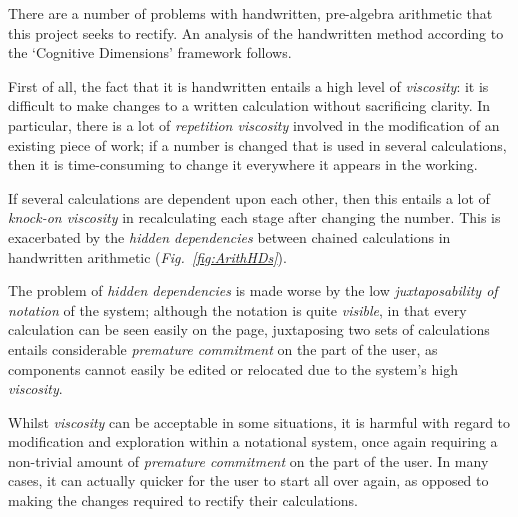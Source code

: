 \documentclass[12pt,twoside,notitlepage,xetex]{report}
\begin{document}
There are a number of problems with handwritten, pre-algebra arithmetic that this project seeks to rectify.  An analysis of the handwritten method according to the `Cognitive Dimensions' framework follows.

First of all, the fact that it is handwritten entails a high level of \emph{viscosity}: it is difficult to make changes to a written calculation without sacrificing clarity.  In particular, there is a lot of \emph{repetition viscosity} involved in the modification of an existing piece of work; if a number is changed that is used in several calculations, then it is time-consuming to change it everywhere it appears in the working.

If several calculations are dependent upon each other, then this entails a lot of \emph{knock-on viscosity} in recalculating each stage after changing the number.  This is exacerbated by the \emph{hidden dependencies} between chained calculations in handwritten arithmetic (\emph{Fig.~\ref{fig:ArithHDs}}).

The problem of \emph{hidden dependencies} is made worse by the low \emph{juxtaposability of notation} of the system; although the notation is quite \emph{visible}, in that every calculation can be seen easily on the page, juxtaposing two sets of calculations entails considerable \emph{premature commitment} on the part of the user, as components cannot easily be edited or relocated due to the system's high \emph{viscosity}.

Whilst \emph{viscosity} can be acceptable in some situations, it is harmful with regard to modification and exploration within a notational system, once again requiring a non-trivial amount of \emph{premature commitment} on the part of the user.  In many cases, it can actually quicker for the user to start all over again, as opposed to making the changes required to rectify their calculations.
\end{document}
